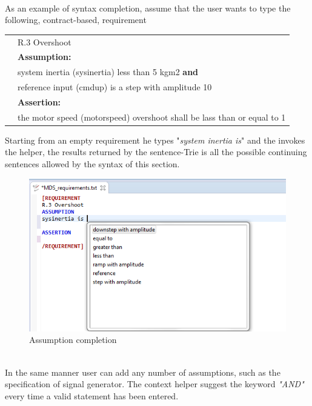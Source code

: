 \paragraph{} As an example of syntax completion, assume that the user wants to type the following, contract-based, requirement
\begin{center}
\begin{tabular}{ll}
&R.3 Overshoot \\
&\textbf{Assumption:}\\
&system inertia (sysinertia) less than 5 kgm2 \textbf{and} \\
&reference input (cmdup) is a step with amplitude 10\\
&\textbf{Assertion:}\\
&the motor speed (motorspeed) overshoot shall be lass than or equal to 1\\
\end{tabular}
\end{center}
Starting from an empty requirement he types "\textit{system inertia is}" and the invokes the helper, the results returned by the sentence-Trie is all the possible continuing sentences allowed by the syntax of this section.
\begin{figure}[!h]
\centering
\includegraphics[width=.6\textwidth]{Figs/assumcompl.png}
\caption{Assumption completion}
\label{fig:assumcompl}
\end{figure}
\noindent
\\
In the same manner user can add any number of assumptions, such as the specification of signal generator. The context helper suggest the keyword \textit{"AND"} every time a valid statement has been entered. 

